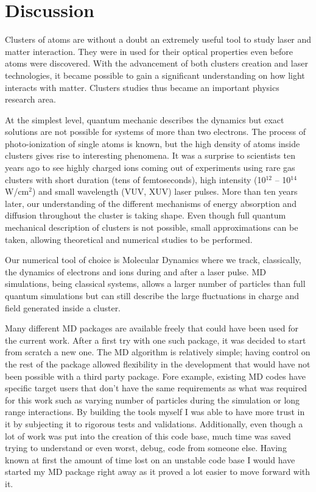\section{Discussion}

Clusters of atoms are without a doubt an extremely useful tool to study
laser and matter interaction. They were in used for their optical properties
even before atoms were discovered. With the advancement of both clusters creation
and laser technologies, it became possible to gain a significant understanding
on how light interacts with matter. Clusters studies thus became an important
physics research area.

At the simplest level, quantum mechanic describes the dynamics but exact solutions
are not possible for systems of more than two electrons.
The process of photo-ionization of single atoms is known, but the high density
of atoms inside clusters gives rise to interesting phenomena. It was a surprise
to scientists ten years ago to see highly charged ions coming out of experiments
using rare gas clusters with short duration (tens of femtoseconds), high intensity
(10$^{12}$ -- 10$^{14}$ W/cm$^2$) and small wavelength (VUV, XUV) laser pulses.
More than ten years later, our understanding of the different mechanisms of energy
absorption and diffusion throughout the cluster is taking shape. Even though full
quantum mechanical description of clusters is not possible, small approximations
can be taken, allowing theoretical and numerical studies to be performed.

Our numerical tool of choice is Molecular Dynamics where we track, classically,
the dynamics of electrons and ions during and after a laser pulse. MD simulations,
being classical systems, allows a larger number of particles than full quantum
simulations but can still describe the large fluctuations in charge and field
generated inside a cluster.

Many different MD packages are available freely that could have been used for
the current work. After a first try with one such package, it was decided to
start from scratch a new one. The MD algorithm is relatively simple; having
control on the rest of the package allowed flexibility in the development that
would have not been possible with a third party package. Fore example, existing
MD codes have specific target users that don't have the same requirements as what
was required for this work such as varying number of particles during the
simulation or long range interactions. By building the tools myself I was able
to have more trust in it by subjecting it to rigorous tests and validations.
Additionally, even though a lot of work was put into the creation of this code
base, much time was saved trying to understand or even worst, debug, code from
someone else. Having known at first the amount of time lost on an unstable code
base I would have started my MD package right away as it proved a lot easier
to move forward with it.


